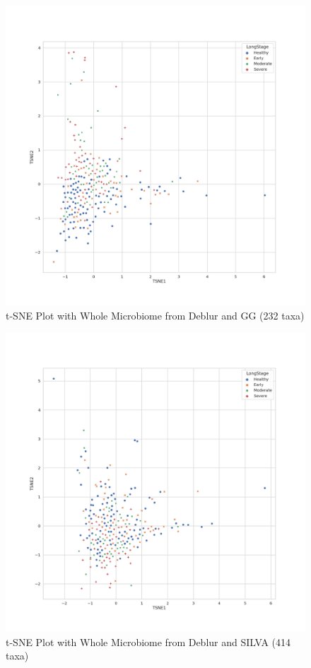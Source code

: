 \documentclass[a4paper]{article}
\begin{document}
            \begin{figure}[p]
                \centering
                \includegraphics[width=0.6 \linewidth]{figures/tSNE/Whole/whole.Deblur.gg.png}
                \caption{t-SNE Plot with Whole Microbiome from Deblur and GG (232 taxa)}
                \label{fig:tsne-whole-deblur-gg}
            \end{figure}

            \begin{figure}[p]
                \centering
                \includegraphics[width=0.6 \linewidth]{figures/tSNE/Whole/whole.Deblur.silva.png}
                \caption{t-SNE Plot with Whole Microbiome from Deblur and SILVA (414 taxa)}
                \label{fig:tsne-whole-deblur-silva}
            \end{figure}
\end{document}
